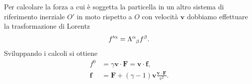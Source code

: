 Per calcolare la forza a cui è soggetta la particella in un altro sistema di
riferimento inerziale $O'$ in moto rispetto a $O$ con velocità $\bm{v}$ dobbiamo
effettuare la trasformazione di Lorentz
\begin{equation}
  f'^{\alpha} = \tensor{\Lambda}{^{\alpha}_{\beta}}f^{\beta}.
\end{equation}
Sviluppando i calcoli si ottiene
\begin{subequations}
  \begin{align}
    f^{0} &= \gamma\bm{v}\cdot\bm{F} = \bm{v}\cdot\bm{f}, \\
    \bm{f} &= \bm{F} + (\gamma - 1)\bm{v}\frac{\bm{v}\cdot\bm{F}}{v^{2}}.
  \end{align}
\end{subequations}


